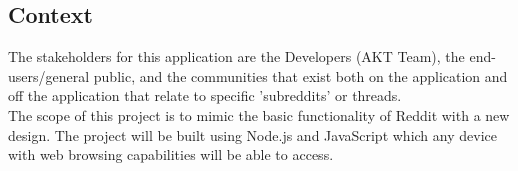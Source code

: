 \documentclass[12pt,fleqn]{article}
\begin{document}
\subsection{Context}

The stakeholders for this application are the Developers (AKT Team), the end-users/general public, and the communities that exist both on the application and off the application that relate to specific 'subreddits' or threads.\\
\newline
The scope of this project is to mimic the basic functionality of Reddit with a new design.  The project will be built using Node.js and JavaScript which any device with web browsing capabilities will be able to access.   
\end{document}
